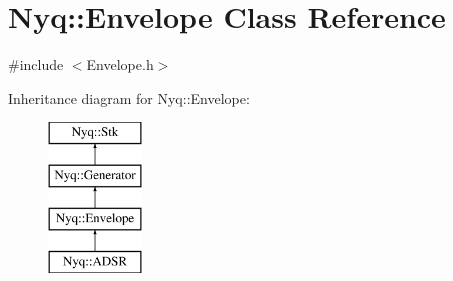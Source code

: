 \hypertarget{class_nyq_1_1_envelope}{}\section{Nyq\+:\+:Envelope Class Reference}
\label{class_nyq_1_1_envelope}


{\ttfamily \#include $<$Envelope.\+h$>$}

Inheritance diagram for Nyq\+:\+:Envelope\+:\begin{figure}[H]
\begin{center}
\leavevmode
\includegraphics[height=4.000000cm]{class_nyq_1_1_envelope}
\end{center}
\end{figure}
